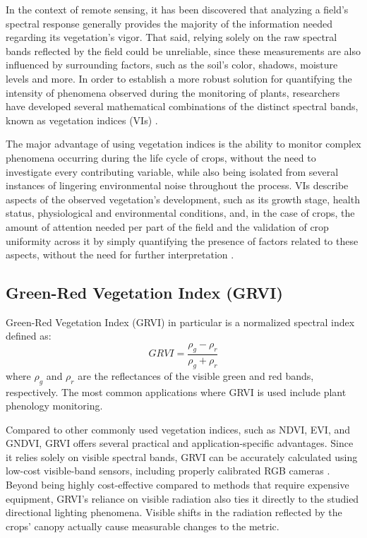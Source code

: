 In the context of remote sensing, it has been discovered that analyzing a field's spectral response generally provides the majority of the information needed regarding its vegetation's vigor. That said, relying solely on the raw spectral bands reflected by the field could be unreliable, since these measurements are also influenced by surrounding factors, such as the soil's color, shadows, moisture levels and more. In order to establish a more robust solution for quantifying the intensity of phenomena observed during the monitoring of plants, researchers have developed several mathematical combinations of the distinct spectral bands, known as vegetation indices (VIs) \cite{review-veg-index}. 

The major advantage of using vegetation indices is the ability to monitor complex phenomena occurring during the life cycle of crops, without the need to investigate every contributing variable, while also being isolated from several instances of lingering environmental noise throughout the process. VIs describe aspects of the observed vegetation’s development, such as its growth stage, health status, physiological and environmental conditions, and, in the case of crops, the amount of attention needed per part of the field and the validation of crop uniformity across it by simply quantifying the presence of factors related to these aspects, without the need for further interpretation \cite{vi-in-precision-agr}.


\subsection{Green-Red Vegetation Index (GRVI)}

Green-Red Vegetation Index (GRVI) in particular is a normalized spectral index defined as:
\[
GRVI = \frac{\rho_g - \rho_r}{\rho_g + \rho_r}
\]
where $\rho_g$ and $\rho_r$ are the reflectances of the visible green and red bands, respectively. The most common applications where GRVI is used include plant phenology monitoring.

Compared to other commonly used vegetation indices, such as NDVI, EVI, and GNDVI, GRVI offers several practical and application-specific advantages. Since it relies solely on visible spectral bands, GRVI can be accurately calculated using low-cost visible-band sensors, including properly calibrated RGB cameras \cite{gpp-grvi-phenology}. Beyond being highly cost-effective compared to methods that require expensive equipment, GRVI's reliance on visible radiation also ties it directly to the studied directional lighting phenomena. Visible shifts in the radiation reflected by the crops' canopy actually cause measurable changes to the metric.


